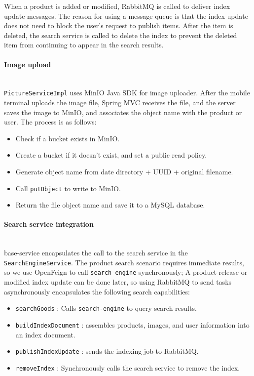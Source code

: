 \documentclass{article}
\begin{document}
When a product is added or modified, RabbitMQ is called to deliver index update messages. The reason for using a message queue is that the index update does not need to block the user's request to publish items. After the item is deleted, the search service is called to delete the index to prevent the deleted item from continuing to appear in the search results.

\paragraph{Image upload}\mbox{}\\

\texttt{PictureServiceImpl} uses MinIO Java SDK for image uploader. After the mobile terminal uploads the image file, Spring MVC receives the file, and the server saves the image to MinIO, and associates the object name with the product or user. The process is as follows:

\begin{itemize}
    \item Check if a bucket exists in MinIO.
    \item Create a bucket if it doesn't exist, and set a public read policy.
    \item Generate object name from date directory + UUID + original filename.
    \item Call \texttt{putObject} to write to MinIO.
    \item Return the file object name and save it to a MySQL database.
\end{itemize}

\paragraph{Search service integration}\mbox{}\\

base-service encapsulates the call to the search service in the \texttt{SearchEngineService}. The product search scenario requires immediate results, so we use OpenFeign to call \texttt{search-engine} synchronously; A product release or modified index update can be done later, so using RabbitMQ to send tasks asynchronously encapsulates the following search capabilities:

\begin{itemize}
    \item \texttt{searchGoods} : Calls \texttt{search-engine} to query search results.
    \item \texttt{buildIndexDocument} : assembles products, images, and user information into an index document.
    \item \texttt{publishIndexUpdate} : sends the indexing job to RabbitMQ.
    \item \texttt{removeIndex} : Synchronously calls the search service to remove the index.
\end{itemize}
\end{document}
